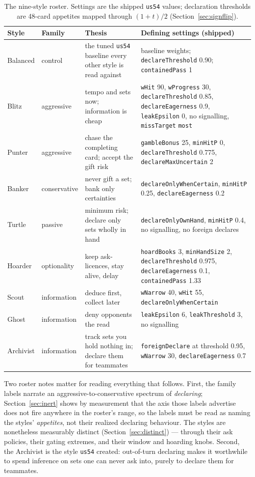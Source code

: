 \documentclass[11pt]{article}
\newcommand{\code}[1]{\texttt{#1}}
\newcommand{\usff}{\code{us54}}
\begin{document}
\begin{table}[t]
\centering
\caption{The nine-style roster. Settings are the shipped \usff{} values; declaration
thresholds are 48-card appetites mapped through $(1+t)/2$ (Section~\ref{sec:signflip}).}
\label{tab:roster}
\footnotesize
\begin{tabular}{@{}p{1.5cm}p{1.7cm}p{4.6cm}p{6.6cm}@{}}
\toprule
Style & Family & Thesis & Defining settings (shipped) \\
\midrule
Balanced & control & the tuned \usff{} baseline every other style is read against &
  baseline weights; \code{declareThreshold} 0.90; \code{containedPass} 1 \\
Blitz & aggressive & tempo and sets now; information is cheap &
  \code{wHit} 90, \code{wProgress} 30, \code{declareThreshold} 0.85,
  \code{declareEagerness} 0.9, \code{leakEpsilon} 0, no signalling,
  \code{missTarget} \code{most} \\
Punter & aggressive & chase the completing card; accept the gift risk &
  \code{gambleBonus} 25, \code{minHitP} 0, \code{declareThreshold} 0.775,
  \code{declareMaxUncertain} 2 \\
Banker & conservative & never gift a set; bank only certainties &
  \code{declareOnlyWhenCertain}, \code{minHitP} 0.25, \code{declareEagerness} 0.2 \\
Turtle & passive & minimum risk; declare only sets wholly in hand &
  \code{declareOnlyOwnHand}, \code{minHitP} 0.4, no signalling, no foreign declares \\
Hoarder & optionality & keep ask-licences, stay alive, delay &
  \code{hoardBooks} 3, \code{minHandSize} 2, \code{declareThreshold} 0.975,
  \code{declareEagerness} 0.1, \code{containedPass} 1.33 \\
Scout & information & deduce first, collect later &
  \code{wNarrow} 40, \code{wHit} 55, \code{declareOnlyWhenCertain} \\
Ghost & information & deny opponents the read &
  \code{leakEpsilon} 6, \code{leakThreshold} 3, no signalling \\
Archivist & information & track sets you hold nothing in; declare them for teammates &
  \code{foreignDeclare} at threshold 0.95, \code{wNarrow} 30,
  \code{declareEagerness} 0.7 \\
\bottomrule
\end{tabular}
\end{table}

Two roster notes matter for reading everything that follows. First, the family labels narrate
an aggressive-to-conservative spectrum of \emph{declaring}; Section~\ref{sec:inert} shows by
measurement that the axis those labels advertise does not fire anywhere in the roster's range,
so the labels must be read as naming the styles' \emph{appetites}, not their realized
declaring behaviour. The styles are nonetheless measurably distinct
(Section~\ref{sec:distinct}) --- through their ask policies, their gating extremes, and their
window and hoarding knobs. Second, the Archivist is the style \usff{} created: out-of-turn
declaring makes it worthwhile to spend inference on sets one can never ask into, purely to
declare them for teammates.
\end{document}
